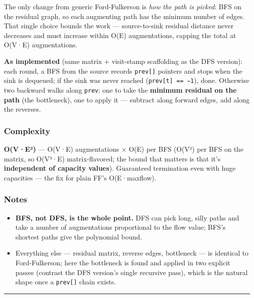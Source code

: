 \documentclass[
  10pt,
  letterpaper,
  onecolumn]{article}
\providecommand{\tightlist}{%
  \setlength{\itemsep}{0pt}\setlength{\parskip}{0pt}}
\begin{document}
The only change from generic Ford-Fulkerson is \emph{how the path is
picked}: BFS on the residual graph, so each augmenting path has the
minimum number of edges. That single choice bounds the work ---
source-to-sink residual distance never decreases and must increase
within O(E) augmentations, capping the total at O(V·E) augmentations.

\textbf{As implemented} (same matrix + visit-stamp scaffolding as the
DFS version): each round, a BFS from the source records
\texttt{prev{[}{]}} pointers and stops when the sink is dequeued; if the
sink was never reached (\texttt{prev{[}t{]}\ ==\ −1}), done. Otherwise
two backward walks along \texttt{prev}: one to take the \textbf{minimum
residual on the path} (the bottleneck), one to apply it --- subtract
along forward edges, add along the reverses.

\hypertarget{complexity-25}{%
\subsubsection{Complexity}\label{complexity-25}}

\textbf{O(V·E²)} --- O(V·E) augmentations × O(E) per BFS (O(V²) per BFS
on the matrix, so O(V³·E) matrix-flavored; the bound that matters is
that it's \textbf{independent of capacity values}). Guaranteed
termination even with huge capacities --- the fix for plain FF's
O(E·maxflow).

\hypertarget{notes-24}{%
\subsubsection{Notes}\label{notes-24}}

\begin{itemize}
\tightlist
\item
  \textbf{BFS, not DFS, is the whole point.} DFS can pick long, silly
  paths and take a number of augmentations proportional to the flow
  value; BFS's shortest paths give the polynomial bound.
\item
  Everything else --- residual matrix, reverse edges, bottleneck --- is
  identical to Ford-Fulkerson; here the bottleneck is found and applied
  in two explicit passes (contrast the DFS version's single recursive
  pass), which is the natural shape once a \texttt{prev{[}{]}} chain
  exists.
\end{itemize}

\begin{center}\rule{0.5\linewidth}{0.5pt}\end{center}
\end{document}
